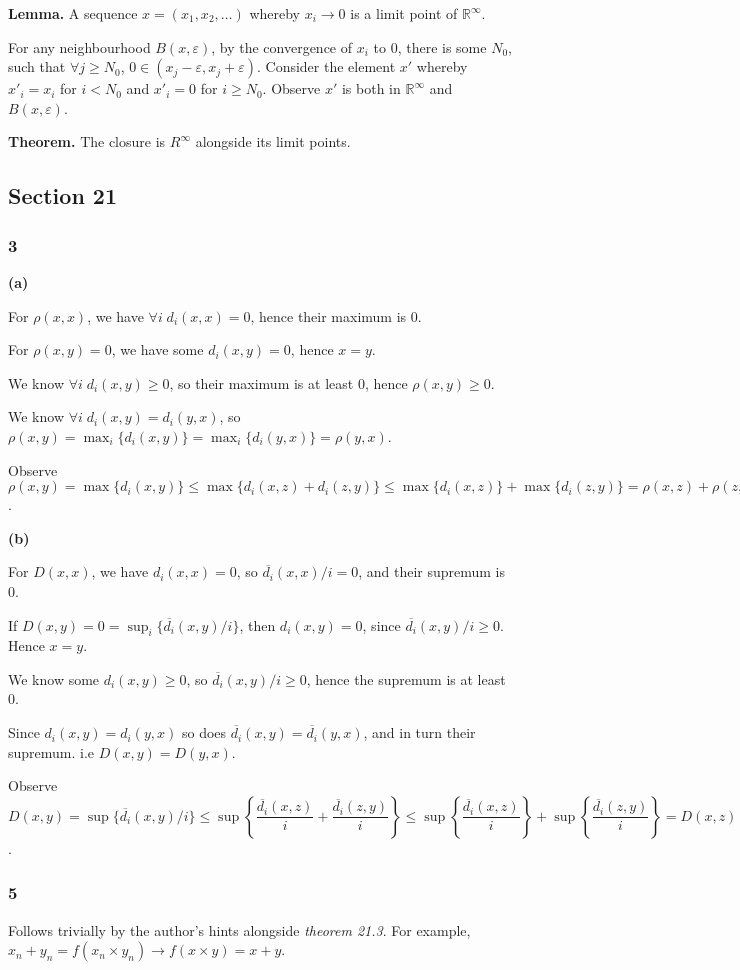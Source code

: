 \documentclass[12pt]{extarticle}
\begin{document}
\textbf{Lemma.} A sequence $x = (x_1, x_2, \dots)$ whereby $x_i \rightarrow 0$ is a limit point of $\mathbb{R}^\infty$.

For any neighbourhood $B ( x, \varepsilon )$, by the convergence of $x_i$ to $0$, there is some $N_0$, such that $\forall j \geq N_0$, $0 \in (x_j - \varepsilon, x_j + \varepsilon)$. Consider the element $x'$ whereby $x'_i = x_i$ for $i < N_0$ and $x'_i = 0$ for $i \geq N_0$. Observe $x'$ is both in $\mathbb{R}^\infty$ and $B(x,\varepsilon)$.

\textbf{Theorem.} The closure is $R^\infty$ alongside its limit points.


\subsection{Section 21}

\subsubsection{3}

\textbf{(a)}

For $\rho(x,x)$, we have $\forall i \; d_i(x,x) = 0$, hence their maximum is $0$.

For $\rho(x,y) = 0$, we have some $d_i(x,y) = 0$, hence $x = y$.

We know $\forall i \; d_i(x,y) \geq 0$, so their maximum is at least $0$, hence $\rho(x,y) \geq 0$.

We know $\forall i \; d_i(x,y) = d_i(y,x)$, so $\rho(x,y) = \max_i \{ d_i(x,y) \} = \max_i \{ d_i(y,x) \} = \rho(y,x)$.

Observe $\rho(x,y) = \max \{ d_i(x,y) \} \leq \max \{ d_i(x,z) + d_i(z,y) \} \leq \max \{ d_i(x,z) \} + \max \{ d_i(z,y) \} = \rho(x,z) + \rho(z,y)$.

\textbf{(b)}

For $D(x,x)$, we have $d_i(x,x) = 0$, so $\overline{d_i}(x,x)/i = 0$, and their supremum is $0$.

If $D(x,y) = 0 = \sup_i \{ \overline{d_i}(x,y)/i \}$, then $d_i(x,y) = 0$, since $\overline{d_i}(x,y)/i \geq 0$. Hence $x = y$.

We know some $d_i(x,y) \geq 0$, so $\overline{d_i}(x,y)/i \geq 0$, hence the supremum is at least $0$.

Since $d_i(x,y) = d_i(y,x)$ so does $\overline{d_i}(x,y) = \overline{d_i}(y,x)$, and in turn their supremum. i.e $D(x,y) = D(y,x)$.

Observe $D(x,y) = \sup \{ \overline{d_i}(x,y)/i \} \leq \sup \left \{ \dfrac{\overline{d_i}(x,z)}{i} + \dfrac{\overline{d_i}(z,y)}{i} \right \} \leq \sup \left \{ \dfrac{\overline{d_i}(x,z)}{i} \right \} + \sup \left \{ \dfrac{\overline{d_i}(z,y)}{i} \right \} = D(x,z) + D(z,y)$.


\subsubsection{5}

Follows trivially by the author's hints alongside \textit{theorem 21.3}. For example, $x_n + y_n = f(x_n \times y_n) \rightarrow f(x \times y) = x + y$.
\end{document}
